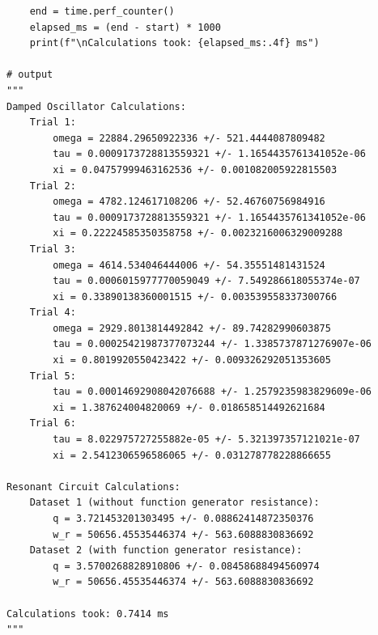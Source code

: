 \documentclass[12pt]{article}
\begin{document}
\begin{verbatim}
    end = time.perf_counter()
    elapsed_ms = (end - start) * 1000
    print(f"\nCalculations took: {elapsed_ms:.4f} ms")
        
# output
"""
Damped Oscillator Calculations:
    Trial 1:
        omega = 22884.29650922336 +/- 521.4444087809482
        tau = 0.0009173728813559321 +/- 1.1654435761341052e-06
        xi = 0.04757999463162536 +/- 0.001082005922815503
    Trial 2:
        omega = 4782.124617108206 +/- 52.46760756984916
        tau = 0.0009173728813559321 +/- 1.1654435761341052e-06
        xi = 0.22224585350358758 +/- 0.0023216006329009288
    Trial 3:
        omega = 4614.534046444006 +/- 54.35551481431524
        tau = 0.0006015977770059049 +/- 7.549286618055374e-07
        xi = 0.33890138360001515 +/- 0.003539558337300766
    Trial 4:
        omega = 2929.8013814492842 +/- 89.74282990603875
        tau = 0.00025421987377073244 +/- 1.3385737871276907e-06
        xi = 0.8019920550423422 +/- 0.009326292051353605
    Trial 5:
        tau = 0.00014692908042076688 +/- 1.2579235983829609e-06
        xi = 1.387624004820069 +/- 0.018658514492621684
    Trial 6:
        tau = 8.022975727255882e-05 +/- 5.321397357121021e-07
        xi = 2.5412306596586065 +/- 0.031278778228866655

Resonant Circuit Calculations:
    Dataset 1 (without function generator resistance):
        q = 3.721453201303495 +/- 0.08862414872350376
        w_r = 50656.45535446374 +/- 563.6088830836692
    Dataset 2 (with function generator resistance):
        q = 3.5700268828910806 +/- 0.08458688494560974
        w_r = 50656.45535446374 +/- 563.6088830836692

Calculations took: 0.7414 ms
"""
\end{verbatim}
\end{document}
